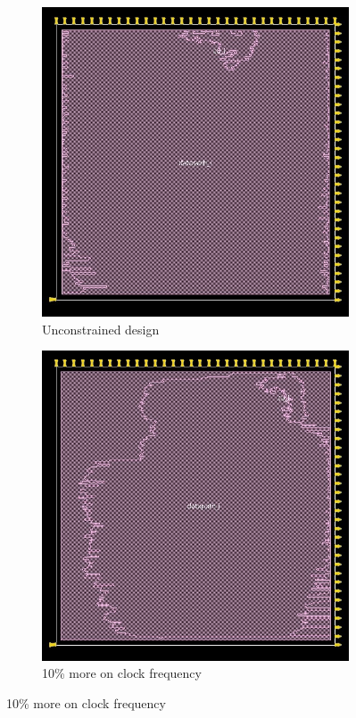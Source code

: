 \begin{figure}[!htbp]
  \centering
  \begin{subfigure}[b]{0.4\linewidth}
\includegraphics[width=\linewidth,scale=0.6,angle=0]{../project/physical_design/images_nopt/DLX_IR_SIZE32_PC_SIZE32_nopt_ameba_prerouting.jpg}
\caption{Unconstrained design}
\label{fig:amebano}
  \end{subfigure}
  \begin{subfigure}[b]{0.4\linewidth}
   \includegraphics[width=\linewidth,scale=0.6,angle=0]{../project/physical_design/images_10/DLX_IR_SIZE32_PC_SIZE32_10_ameba_prerouting.jpg}
\caption{10\% more on clock frequency}
\label{fig:ameba10}
  \end{subfigure}
  

\end{figure}
